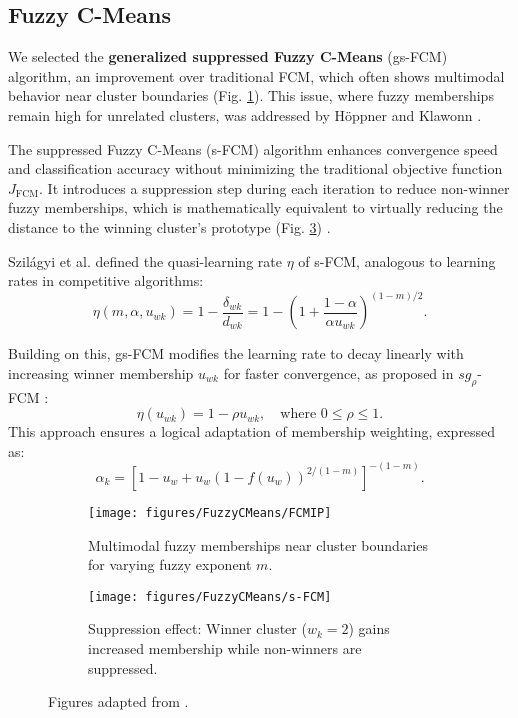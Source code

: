 \subsection{Fuzzy C-Means}

We selected the \textbf{generalized suppressed Fuzzy C-Means} (gs-FCM) algorithm, an improvement over traditional FCM, which often shows multimodal behavior near cluster boundaries (Fig. \ref{fig:FCMIP}). This issue, where fuzzy memberships remain high for unrelated clusters, was addressed by Höppner and Klawonn \cite{Hoppner2003}.

The suppressed Fuzzy C-Means (s-FCM) algorithm \cite{Fan2003} enhances convergence speed and classification accuracy without minimizing the traditional objective function \( J_{\text{FCM}} \). It introduces a suppression step during each iteration to reduce non-winner fuzzy memberships, which is mathematically equivalent to virtually reducing the distance to the winning cluster's prototype (Fig. \ref{fig:VirtualReduction}) \cite{Szilagyi2010}.

Szilágyi et al. \cite{Szilagyi2010} defined the quasi-learning rate \(\eta\) of s-FCM, analogous to learning rates in competitive algorithms:
\[
\eta(m, \alpha, u_{wk}) = 1 - \frac{\delta_{wk}}{d_{wk}} = 1 - \left( 1 + \frac{1-\alpha}{\alpha u_{wk}} \right)^{(1-m)/2}.
\]

Building on this, gs-FCM modifies the learning rate to decay linearly with increasing winner membership \(u_{wk}\) for faster convergence, as proposed in $sg_\rho$-FCM \cite{Szilagyi2014}:
\[
\eta(u_{wk}) = 1 - \rho u_{wk}, \quad \text{where } 0 \leq \rho \leq 1.
\]
This approach ensures a logical adaptation of membership weighting, expressed as:
\[
\alpha_k = \left[ 1 - u_w + u_w \left( 1 - f(u_w) \right)^{2/(1-m)} \right]^{-(1-m)}.
\]

\begin{figure}[htbp]
    \centering
    \begin{subfigure}{0.45\textwidth}
        \centering
        \texttt{[image: figures/FuzzyCMeans/FCMIP]}
        \caption{Multimodal fuzzy memberships near cluster boundaries for varying fuzzy exponent \(m\).}
        \label{fig:FCMIP}
    \end{subfigure}
    \hfill
    \begin{subfigure}{0.45\textwidth}
        \centering
        \texttt{[image: figures/FuzzyCMeans/s-FCM]}
        \caption{Suppression effect: Winner cluster (\(w_k=2\)) gains increased membership while non-winners are suppressed.}
        \label{fig:VirtualReduction}
    \end{subfigure}
    \caption{Figures adapted from \cite{Szilagyi2014}.}
\end{figure}
